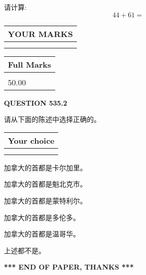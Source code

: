 \documentclass{ctexart}
\begin{document}
  
 
请计算:
\begin{equation}
44 +  %
61 = \nonumber
\end{equation}
 

 

 
  
\vspace{0.2in}
  
\noindent\begin{tabular}{|l|}
\hline
 YOUR MARKS  \\
\hline
 \\ 
 \\ 
\hline
\end{tabular}
\hspace{0.05in} \begin{tabular}{|l|}
\hline
 Full Marks  \\
\hline
 \\ 
50.00 \\
\hline
\end{tabular}
{\textbf{\Large{QUESTION
535.2 
}}}
  
  
请从下面的陈述中选择正确的。
  
  
\noindent\hspace{3.0in} \begin{tabular}{|l|}
\hline
Your choice \\
\hline
 \\ 
 \\ 
\hline
\end{tabular}
  
  
 
 
加拿大的首都是卡尔加里。
 
 
加拿大的首都是魁北克市。
 
 
加拿大的首都是蒙特利尔。
 
 
加拿大的首都是多伦多。
 
 
加拿大的首都是温哥华。
 
 
 上述都不是。
 
 
   
   
 \vspace{0.2in}
 
   
   
   
   
\vspace{1.0in} 
{\textbf{\large{ *** END OF PAPER, THANKS *** }}} 
   
\end{document}
